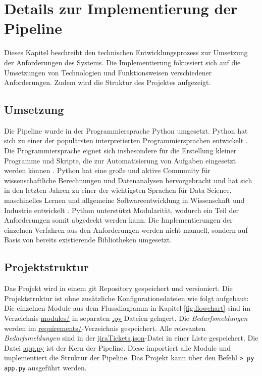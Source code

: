\section{Details zur Implementierung der Pipeline}
Dieses Kapitel beschreibt den technischen Entwicklungsprozess zur Umsetzung der Anforderungen des Systems. Die Implementierung fokussiert sich auf die Umsetzungen von Technologien und Funktionsweisen verschiedener Anforderungen. Zudem wird die Struktur des Projektes aufgezeigt.
\subsection{Umsetzung}
Die Pipeline wurde in der Programmiersprache Python umgesetzt. Python hat sich zu einer der populärsten interpretierten Programmiersprachen entwickelt \cite{mckinney2012python}. Die Programmiersprache eignet sich insbesondere für die Erstellung kleiner Programme und Skripte, die zur Automatisierung von Aufgaben eingesetzt werden können \cite{mckinney2012python}. Python hat eine große und aktive Community für wissenschaftliche Berechnungen und Datenanalysen hervorgebracht und hat sich in den letzten Jahren zu einer der wichtigsten Sprachen für Data Science, maschinelles Lernen und allgemeine Softwareentwicklung in Wissenschaft und Industrie entwickelt \cite{mckinney2012python}. Python unterstützt Modularität, wodurch ein Teil der Anforderungen somit abgedeckt werden kann. Die Implementierungen der einzelnen Verfahren aus den Anforderungen werden nicht manuell, sondern auf Basis von bereits existierende Bibliotheken umgesetzt.
\subsection{Projektstruktur}
\label{sec:projektstruktur}
Das Projekt wird in einem git Repository gespeichert und versioniert. Die Projektstruktur ist ohne zusätzliche Konfigurationsdateien wie folgt aufgebaut:
Die einzelnen Module aus dem Flussdiagramm in Kapitel \ref{fig:flowchart} sind im Verzeichnis \url{modules/} in separaten \url{.py} Dateien gelagert. Die \emph{Bedarfsmeldungen} werden im \url{requirements/}-Verzeichnis gespeichert. Alle relevanten \emph{Bedarfsmeldungen} sind in der \url{jiraTickets.json}-Datei in einer Liste gespeichert. Die Datei \url{app.py} ist der Kern der Pipeline. Diese importiert alle Module und implementiert die Struktur der Pipeline. Das Projekt kann über den Befehl \lstinline{> py app.py} ausgeführt werden.
